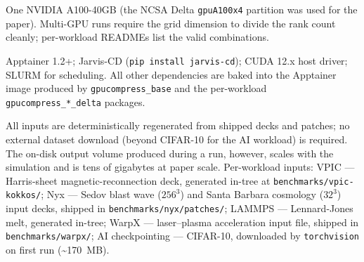 \documentclass[conference]{IEEEtran}
\begin{document}
\artin

One NVIDIA A100-40GB (the NCSA Delta \texttt{gpuA100x4}
partition was used for the paper). Multi-GPU runs require the
grid dimension to divide the rank count cleanly; per-workload
READMEs list the valid combinations.

Apptainer 1.2+; Jarvis-CD (\texttt{pip install jarvis-cd}); CUDA
12.x host driver; SLURM for scheduling. All other dependencies
are baked into the Apptainer image produced by
\texttt{gpucompress\_base} and the per-workload
\texttt{gpucompress\_*\_delta} packages.

All inputs are deterministically regenerated from shipped decks
and patches; no external dataset download (beyond CIFAR-10 for
the AI workload) is required. The on-disk output volume
produced during a run, however, scales with the simulation and
is tens of gigabytes at paper scale. Per-workload inputs:
VPIC --- Harris-sheet magnetic-reconnection deck, generated
in-tree at \texttt{benchmarks/vpic-kokkos/}; Nyx --- Sedov
blast wave ($256^3$) and Santa Barbara cosmology ($32^3$)
input decks, shipped in \texttt{benchmarks/nyx/patches/};
LAMMPS --- Lennard-Jones melt, generated in-tree; WarpX ---
laser--plasma acceleration input file, shipped in
\texttt{benchmarks/warpx/}; AI checkpointing --- CIFAR-10,
downloaded by \texttt{torchvision} on first run
(\textasciitilde 170~MB).
\end{document}
